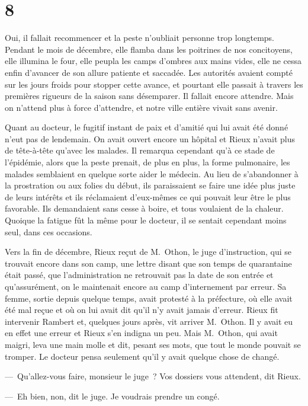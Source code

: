 \documentclass[french,twoside]{book} %
\begin{document}
\section[{8}]{8}
\noindent Oui, il fallait recommencer et la peste n’oubliait personne trop longtemps. Pendant le mois de décembre, elle flamba dans les poitrines de nos concitoyens, elle illumina le four, elle peupla les camps d’ombres aux mains vides, elle ne cessa enfin d’avancer de son allure patiente et saccadée. Les autorités avaient compté sur les jours froids pour stopper cette avance, et pourtant elle passait à travers les premières rigueurs de la saison sans désemparer. Il fallait encore attendre. Mais on n’attend plus à force d’attendre, et notre ville entière vivait sans avenir.\par
Quant au docteur, le fugitif instant de paix et d’amitié qui lui avait été donné n’eut pas de lendemain. On avait ouvert encore un hôpital et Rieux n’avait plus de tête-à-tête qu’avec les malades. Il remarqua cependant qu’à ce stade de l’épidémie, alors que la peste prenait, de plus en plus, la forme pulmonaire, les malades semblaient en quelque sorte aider le médecin. Au lieu de s’abandonner à la prostration ou aux folies du début, ils paraissaient se faire une idée plus juste de leurs intérêts et ils réclamaient d’eux-mêmes ce qui pouvait leur être le plus favorable. Ils demandaient sans cesse à boire, et tous voulaient de la chaleur. Quoique la fatigue fût la même pour le docteur, il se sentait cependant moins seul, dans ces occasions.\par
Vers la fin de décembre, Rieux reçut de M. Othon, le juge d’instruction, qui se trouvait encore dans son camp, une lettre disant que son temps de quarantaine était passé, que l’administration ne retrouvait pas la date de son entrée et qu’assurément, on le maintenait encore au camp d’internement par erreur. Sa femme, sortie depuis quelque temps, avait protesté à la préfecture, où elle avait été mal reçue et où on lui avait dit qu’il n’y avait jamais d’erreur. Rieux fit intervenir Rambert et, quelques jours après, vit arriver M. Othon. Il y avait eu en effet une erreur et Rieux s’en indigna un peu. Mais M. Othon, qui avait maigri, leva une main molle et dit, pesant ses mots, que tout le monde pouvait se tromper. Le docteur pensa seulement qu’il y avait quelque chose de changé.\par
— Qu’allez-vous faire, monsieur le juge ? Vos dossiers vous attendent, dit Rieux.\par
— Eh bien, non, dit le juge. Je voudrais prendre un congé.\par
\end{document}
